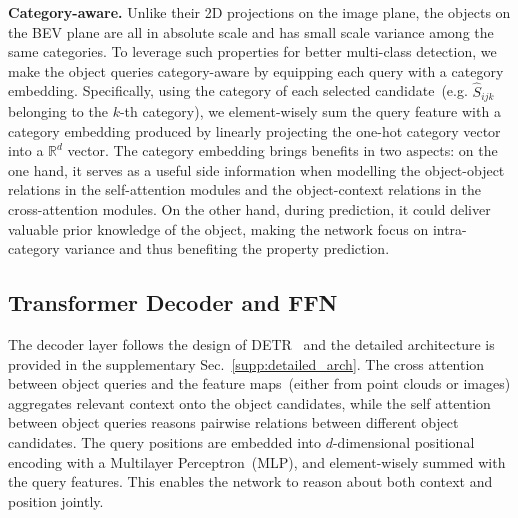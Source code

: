 \noindent\textbf{Category-aware.}  
Unlike the{ir} 2D projections on the image plane, the objects on the BEV plane are all in absolute scale and has small scale variance 
among the same categories. To leverage such properties for better multi-class detection, we make the object queries category-aware by equipping each query with a category embedding. Specifically, using the category of each selected candidate~(e.g. $\hat S_{ijk}$ {belonging} to the $k$-th category), we element-wisely sum the query feature with a category embedding produced by linearly projecting the one-hot category vector into a $\mathbb{R}^d$ vector. The category embedding brings benefits {in} two aspects: on {the} one hand, it serves as a useful side information when modelling the object-object relations in {the self-attention 
modules}
and the object-context relations in {the cross-attention modules.}
On the other hand, during prediction, it could deliver valuable prior knowledge of the object, making the network {focus} on intra-category variance and {thus} benefiting the property prediction. 
















\subsection{Transformer Decoder and FFN} 




\noindent The decoder layer follows the {design} of DETR~\cite{misra20213detr} 
and the detailed architecture is provided in the supplementary Sec.~\ref{supp:detailed_arch}.
The cross attention between object queries and the feature maps~(either from point clouds or images) aggregates relevant context onto the object candidates, while the self attention between object queries reasons pairwise relations between different object candidates. The query positions are embedded into $d$-dimensional positional encoding with a Multilayer Perceptron~(MLP), {and element-wisely summed with the query features}. This enables the network to reason about both context and position jointly. 

